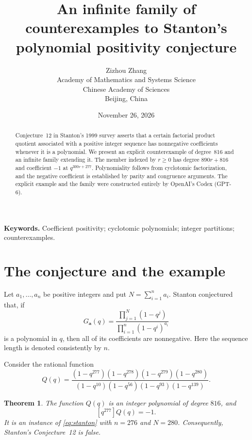 \documentclass[11pt]{article}
\title{An infinite family of counterexamples to\newline
Stanton's polynomial positivity conjecture}
\author{Zizhou Zhang\\[0.5em]
\small Academy of Mathematics and Systems Science\\
\small Chinese Academy of Sciences\\
\small Beijing, China}
\date{November 26, 2026}
\newtheorem{theorem}{Theorem}
\begin{document}
\maketitle

\begin{abstract}
Conjecture~12 in Stanton's 1999 survey asserts that a certain factorial
product quotient associated with a positive integer sequence has
nonnegative coefficients whenever it is a polynomial. We present an
explicit counterexample of degree~816 and an infinite family extending
it. The member indexed by $r\geq0$ has degree $890r+816$ and coefficient
$-1$ at $q^{300r+277}$. Polynomiality follows from cyclotomic
factorization, and the negative coefficient is established by parity
and congruence arguments. The explicit example and the family were
constructed entirely by OpenAI's Codex (GPT-6).
\end{abstract}

\medskip
\noindent\textbf{Keywords.} Coefficient positivity; cyclotomic polynomials;
integer partitions; counterexamples.

\section{The conjecture and the example}

Let $a_1,\ldots,a_n$ be positive integers and put $N=\sum_{i=1}^n a_i$.
Stanton \cite[Conjecture~12]{Stanton} conjectured that, if
\begin{equation}\label{eq:stanton}
 G_{\boldsymbol a}(q)
 =\frac{\prod_{j=1}^{N}(1-q^j)}
        {\prod_{i=1}^{n}(1-q^i)^{a_i}}
\end{equation}
is a polynomial in $q$, then all of its coefficients are nonnegative.
Here the sequence length is denoted consistently by $n$.

Consider the rational function
\begin{equation}\label{eq:example}
 Q(q)=\frac{(1-q^{277})(1-q^{278})(1-q^{279})(1-q^{280})}
 {(1-q^{10})(1-q^{56})(1-q^{93})(1-q^{139})}.
\end{equation}

\begin{theorem}\label{thm:counterexample}
The function $Q(q)$ is an integer polynomial of degree $816$, and
\[
 [q^{277}]Q(q)=-1.
\]
It is an instance of \eqref{eq:stanton} with $n=276$ and $N=280$.
Consequently, Stanton's Conjecture~12 is false.
\end{theorem}
\end{document}
